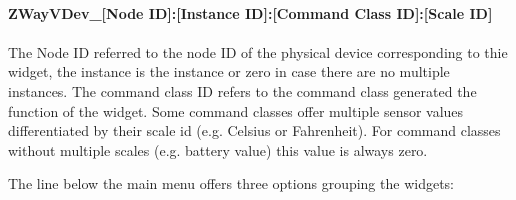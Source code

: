 \paragraph{ZWayVDev\_[Node ID]:[Instance ID]:[Command Class ID]:[Scale ID]}

\paragraph{}

The Node ID referred to the node ID of the physical device corresponding to thie widget, 
the instance is the instance or zero in case there are no multiple instances.
The command class ID refers to the command class generated the function of the widget.
Some command classes offer multiple sensor values differentiated by their scale id (e.g. 
Celsius or Fahrenheit). For command classes without multiple scales (e.g. battery value) 
this value is always zero.

The line below the main menu offers three options grouping the widgets:

